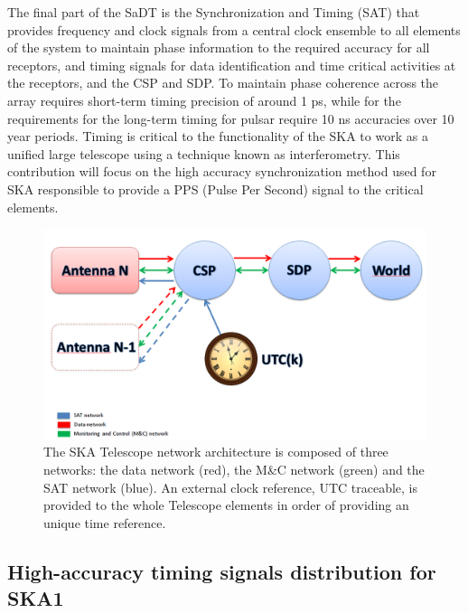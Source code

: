 The final part of the SaDT is the Synchronization and Timing (SAT) that provides frequency and clock signals from a central clock ensemble to all elements of the system to maintain phase information to the required accuracy for all receptors, and timing signals for data identification and time critical activities at the receptors, and the CSP and SDP. To maintain phase coherence across the array requires short-term timing precision of around 1 ps, while for the requirements for the long-term timing for pulsar require 10 ns accuracies over 10 year periods. Timing is critical to the functionality of the SKA to work as a unified large telescope using a technique known as interferometry. This contribution will focus on the high accuracy synchronization method used for SKA responsible to provide a PPS (Pulse Per Second) signal to the critical elements. 

\begin{figure}[H]
	\centering
	\includegraphics[scale=0.4]{img/ska_network_arch}
	\caption{The SKA Telescope network architecture is composed of three networks: the data network (red), the M\&C network (green) and the SAT network (blue). An external clock reference, UTC traceable, is provided to the whole Telescope elements in order of providing an unique time reference.}
	\label{fig:ska_net_arch1}
\end{figure}

\subsection{High-accuracy timing signals distribution for SKA1} \label{subsec:ska-distribution}

